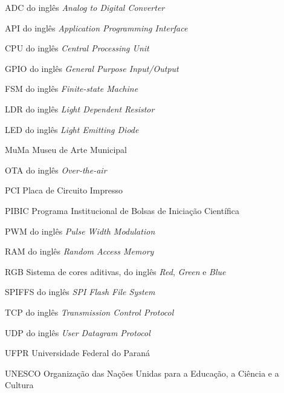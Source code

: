\begin{siglas}
    \item[ADC] do inglês \emph{Analog to Digital Converter}
    \item[API] do inglês \emph{Application Programming Interface}
    \item[CPU] do inglês \emph{Central Processing Unit}
    \item[GPIO] do inglês \emph{General Purpose Input/Output}
    \item[FSM] do inglês \emph{Finite-state Machine}
    \item[LDR] do inglês \emph{Light Dependent Resistor}
    \item[LED] do inglês \emph{Light Emitting Diode}
    \item[MuMa] Museu de Arte Municipal
    \item[OTA] do inglês \emph{Over-the-air}
    \item[PCI] Placa de Circuito Impresso
    \item[PIBIC] Programa Institucional de Bolsas de Iniciação Científica
    \item[PWM] do inglês \emph{Pulse Width Modulation}
    \item[RAM] do inglês \emph{Random Access Memory}
    \item[RGB] Sistema de cores aditivas, do inglês \emph{Red}, \emph{Green} e \emph{Blue}
    \item[SPIFFS] do inglês \emph{SPI Flash File System}
    \item[TCP] do inglês \emph{Transmission Control Protocol}
    \item[UDP] do inglês \emph{User Datagram Protocol}
    \item[UFPR] Universidade Federal do Paraná
    \item[UNESCO] Organização das Nações Unidas para a Educação, a Ciência e a Cultura
\end{siglas}

